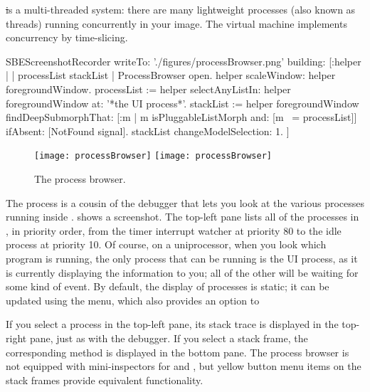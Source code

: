 \documentclass[a4paper,10pt,twoside]{book}
\begin{document}
\st is a multi-threaded system: there are many lightweight processes (also known as threads) running concurrently in your image.
The \sq virtual machine implements concurrency by time-slicing.

\begin{ExecuteSmalltalkScript}
SBEScreenshotRecorder writeTo: './figures/processBrowser.png' building: [:helper |
	| processList stackList |
	ProcessBrowser open.
	helper scaleWindow: helper foregroundWindow.
	processList := helper selectAnyListIn: helper foregroundWindow at: '*the UI process*'.
	stackList := helper foregroundWindow findDeepSubmorphThat: [:m | m isPluggableListMorph and: [m ~= processList]] ifAbsent: [NotFound signal].
	stackList changeModelSelection: 1.
]
\end{ExecuteSmalltalkScript}
\begin{figure}[btp]
	\begin{center}
	\ifluluelse
		{\texttt{[image: processBrowser]}}
		{\texttt{[image: processBrowser]}}
	\end{center}
	\caption{The process browser.}
	\label{fig:processBrowser}
\end{figure}

The process  is a cousin of the debugger that lets you look at the various processes running inside \sq.
 shows a screenshot.
The top-left pane lists all of the processes in \sq, in priority order, from the timer interrupt watcher at priority 80 to the idle process at priority 10.
Of course, on a uniprocessor, when you look which program is running, the only process that can be running is the UI process, as it is currently displaying the information to you; all of the other will be waiting for some kind of event.
By default, the display of processes is static; it can be updated using the  menu, which also provides an option to 

If you select a process in the top-left pane, its stack trace is displayed in the top-right pane, just as with the debugger.
If you select a stack frame, the corresponding method is displayed in the bottom pane.
The process browser is not equipped with mini-inspectors for \self and , but yellow button menu items on the stack frames provide equivalent functionality.

\end{document}
